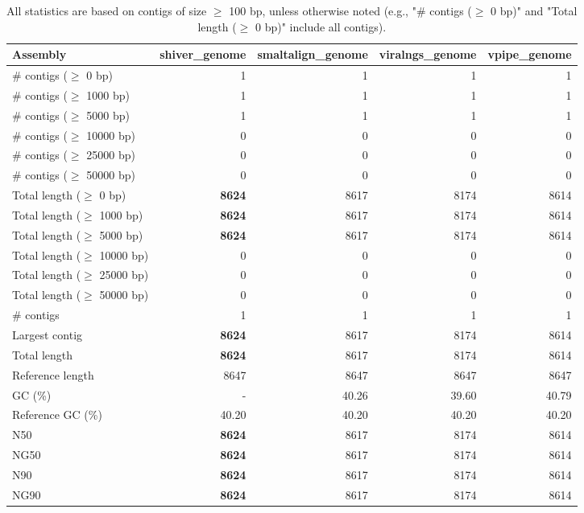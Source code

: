 \documentclass[12pt,a4paper]{article}
\begin{document}
\begin{table}[ht]
\begin{center}
\caption{All statistics are based on contigs of size $\geq$ 100 bp, unless otherwise noted (e.g., "\# contigs ($\geq$ 0 bp)" and "Total length ($\geq$ 0 bp)" include all contigs).}
\begin{tabular}{|l*{4}{|r}|}
\hline
Assembly & shiver\_genome & smaltalign\_genome & viralngs\_genome & vpipe\_genome \\ \hline
\# contigs ($\geq$ 0 bp) & 1 & 1 & 1 & 1 \\ \hline
\# contigs ($\geq$ 1000 bp) & 1 & 1 & 1 & 1 \\ \hline
\# contigs ($\geq$ 5000 bp) & 1 & 1 & 1 & 1 \\ \hline
\# contigs ($\geq$ 10000 bp) & 0 & 0 & 0 & 0 \\ \hline
\# contigs ($\geq$ 25000 bp) & 0 & 0 & 0 & 0 \\ \hline
\# contigs ($\geq$ 50000 bp) & 0 & 0 & 0 & 0 \\ \hline
Total length ($\geq$ 0 bp) & {\bf 8624} & 8617 & 8174 & 8614 \\ \hline
Total length ($\geq$ 1000 bp) & {\bf 8624} & 8617 & 8174 & 8614 \\ \hline
Total length ($\geq$ 5000 bp) & {\bf 8624} & 8617 & 8174 & 8614 \\ \hline
Total length ($\geq$ 10000 bp) & 0 & 0 & 0 & 0 \\ \hline
Total length ($\geq$ 25000 bp) & 0 & 0 & 0 & 0 \\ \hline
Total length ($\geq$ 50000 bp) & 0 & 0 & 0 & 0 \\ \hline
\# contigs & 1 & 1 & 1 & 1 \\ \hline
Largest contig & {\bf 8624} & 8617 & 8174 & 8614 \\ \hline
Total length & {\bf 8624} & 8617 & 8174 & 8614 \\ \hline
Reference length & 8647 & 8647 & 8647 & 8647 \\ \hline
GC (\%) & - & 40.26 & 39.60 & 40.79 \\ \hline
Reference GC (\%) & 40.20 & 40.20 & 40.20 & 40.20 \\ \hline
N50 & {\bf 8624} & 8617 & 8174 & 8614 \\ \hline
NG50 & {\bf 8624} & 8617 & 8174 & 8614 \\ \hline
N90 & {\bf 8624} & 8617 & 8174 & 8614 \\ \hline
NG90 & {\bf 8624} & 8617 & 8174 & 8614 \\ \hline

\end{tabular}
\end{center}
\end{table}
\end{document}
